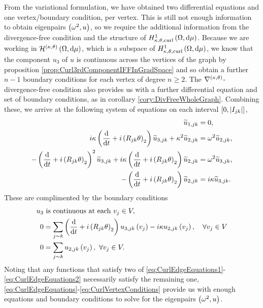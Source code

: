 From the variational formulation, we have obtained two differential equations and one vertex/boundary condition, per vertex.
This is still not enough information to obtain eigenpairs $\left( \omega^2, u \right)$, so we require the additional information from the divergence-free condition and the structure of $H^1_{\kappa,\theta,\mathrm{curl}}\left( \Omega, \mathrm{d}\mu \right)$.
Because we are working in $\mathcal{H}^{\left( \kappa, \theta \right)}\left( \Omega, \mathrm{d}\mu \right)$, which is a subspace of $H^1_{\kappa,\theta,\mathrm{curl}}\left( \Omega, \mathrm{d}\mu \right)$, we know that the component $u_3$ of $u$ is continuous across the vertices of the graph by proposition \ref{prop:Curl3rdComponentIFFInGradSpace} and so obtain a further $n-1$ boundary conditions for each vertex of degree $n\geq2$.
The $\nabla^{\left( \kappa, \theta \right)}$-divergence-free condition also provides us with a further differential equation and set of boundary conditions, as in corollary \ref{cory:DivFreeWholeGraph}.
Combining these, we arrive at the following system of equations on each interval $\left[ 0,\left\lvert I_{jk} \right\rvert \right]$,
\begin{subequations} \label{eq:CurlEdgeEquations}
	\begin{align}
		\widetilde{u}_{1,jk} &= 0, \\
		i\kappa\left( \dfrac{\mathrm{d}}{\mathrm{d}t} + i\left( R_{jk}\theta \right)_2 \right)\widetilde{u}_{3,jk} + \kappa^2\widetilde{u}_{2,jk} &= \omega^2 \widetilde{u}_{2,jk}, \label{eq:CurlEdgeEquations1} \\
		-\left( \dfrac{\mathrm{d}}{\mathrm{d}t} + i\left( R_{jk}\theta \right)_2 \right)^2\widetilde{u}_{3,jk} + i\kappa\left( \dfrac{\mathrm{d}}{\mathrm{d}t} + i\left( R_{jk}\theta \right)_2 \right)\widetilde{u}_{2,jk} &= \omega^2\widetilde{u}_{3,jk}, \label{eq:CurlEdgeEquations2} \\
		-\left( \dfrac{\mathrm{d}}{\mathrm{d}t} + i\left( R_{jk}\theta \right)_2 \right)\widetilde{u}_{2,jk} &= i\kappa\widetilde{u}_{3,jk}. \label{eq:CurlEdgeEquations3}
	\end{align}
\end{subequations}
These are complimented by the boundary conditions
\begin{subequations} \label{eq:CurlVertexConditions}
	\begin{align}
		u_3 &\text{ is continuous at each } v_j\in V, \label{eq:CurlVertexConditionsCty}\\
		0 &= \sum_{j\sim k} \left( \dfrac{\mathrm{d}}{\mathrm{d}t} + i\left( R_{jk}\theta \right)_2 \right)u_{3,jk}\left( v_j \right) - i\kappa u_{2,jk}\left( v_j \right), \quad\forall v_j\in V \label{eq:CurlVertexConditionsSumDeriv}\\
		0 &= \sum_{j\sim k}u_{2,jk}\left( v_j \right), \ \forall v_j\in V. \label{eq:CurlVertexConditionsSum2}
	\end{align}
\end{subequations}
Noting that any functions that satisfy two of \eqref{eq:CurlEdgeEquations1}-\eqref{eq:CurlEdgeEquations2} necessarily satisfy the remaining one, \eqref{eq:CurlEdgeEquations}-\eqref{eq:CurlVertexConditions} provide us with enough equations and boundary conditions to solve for the eigenpairs $\left( \omega^2, u \right)$.


